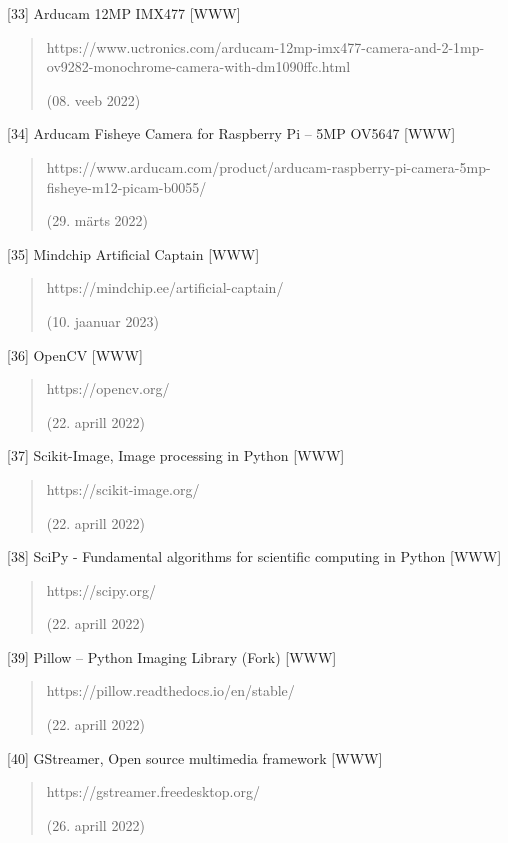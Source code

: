 \documentclass[12pt,a4paper]{report}
\begin{document}
{[}33{]} Arducam 12MP IMX477 {[}WWW{]}

\begin{quote}
https://www.uctronics.com/arducam-12mp-imx477-camera-and-2-1mp-ov9282-monochrome-camera-with-dm1090ffc.html

(08. veeb 2022)
\end{quote}

{[}34{]} Arducam Fisheye Camera for Raspberry Pi -- 5MP OV5647 {[}WWW{]}

\begin{quote}
https://www.arducam.com/product/arducam-raspberry-pi-camera-5mp-fisheye-m12-picam-b0055/

(29. märts 2022)
\end{quote}

{[}35{]} Mindchip Artificial Captain {[}WWW{]}

\begin{quote}
https://mindchip.ee/artificial-captain/

(10. jaanuar 2023)
\end{quote}

{[}36{]} OpenCV {[}WWW{]}

\begin{quote}
https://opencv.org/

(22. aprill 2022)
\end{quote}

{[}37{]} Scikit-Image, Image processing in Python {[}WWW{]}

\begin{quote}
https://scikit-image.org/

(22. aprill 2022)
\end{quote}

{[}38{]} SciPy - Fundamental algorithms for scientific computing in Python {[}WWW{]}

\begin{quote}
https://scipy.org/

(22. aprill 2022)
\end{quote}

{[}39{]} Pillow -- Python Imaging Library (Fork) {[}WWW{]}

\begin{quote}
https://pillow.readthedocs.io/en/stable/

(22. aprill 2022)
\end{quote}

{[}40{]} GStreamer, Open source multimedia framework {[}WWW{]}

\begin{quote}
https://gstreamer.freedesktop.org/

(26. aprill 2022)
\end{quote}
\end{document}
